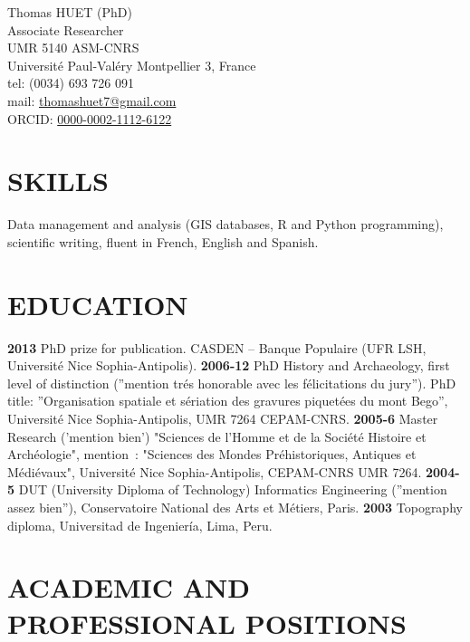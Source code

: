 \documentclass[11pt]{report} %
\begin{document}
Thomas HUET (PhD) \\
Associate Researcher \\
UMR 5140 ASM-CNRS\\
Universit\'{e} Paul-Val\'{e}ry Montpellier 3, France \\
tel: (0034) 693 726 091 \\
mail: \href{mailto:thomashuet7@gmail.com}{thomashuet7@gmail.com} \\
ORCID: \href{https://orcid.org/0000-0002-1112-6122}{0000-0002-1112-6122} \\
 
\section*{SKILLS}

Data management and analysis (GIS databases, R and Python programming), scientific writing, fluent in French, English and Spanish. 

\section*{EDUCATION}

\textbf{2013 }PhD prize for publication. CASDEN -- Banque Populaire (UFR LSH, Universit\'{e} Nice Sophia-Antipolis).
\smallbreak
\textbf{2006-12 }PhD History and Archaeology, first level of distinction (''mention tr\'{e}s honorable avec les f\'{e}licitations du jury''). PhD title: ''Organisation spatiale et s\'{e}riation des gravures piquet\'{e}es du mont Bego'', Universit\'{e} Nice Sophia-Antipolis, UMR 7264 CEPAM-CNRS.
\smallbreak
\textbf{2005-6 }Master Research ('mention bien') "Sciences de l'Homme et de la Soci\'{e}t\'{e} Histoire et Arch\'{e}ologie", mention~: "Sciences des Mondes Pr\'{e}historiques, Antiques et M\'{e}di\'{e}vaux", Universit\'{e} Nice Sophia-Antipolis, CEPAM-CNRS UMR 7264.
\smallbreak
\textbf{2004-5 }DUT (University Diploma of Technology) Informatics Engineering (''mention assez bien''), Conservatoire National des Arts et M\'{e}tiers, Paris.
\smallbreak
\textbf{2003 } Topography diploma, Universitad de Ingenier\'{i}a, Lima, Peru.

\section*{ACADEMIC AND PROFESSIONAL POSITIONS}
\end{document}
